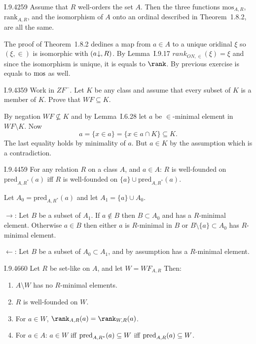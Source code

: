 \begin{lexcopy}{I.9.42}{59}
Assume that $R$ well-orders the set $A$. Then the three 
functions \(\textrm{mos}_{A,R}\), \(\textrm{rank}_{A,R}\),
and the isomorphism of $A$ onto an ordinal described in
Theorem~1.8.2, are all the same.
\end{lexcopy}
The proof of Theorem~1.8.2 dedines a map from \(a\in A\)
to a unique oridinal \(\xi\) so \((\xi,\in)\)
is isomorphic with \((a\kern -0.2em\downarrow,R)\).
By Lemma~I.9.17 \(rank_{ON,\in}(\xi) = \xi\)
and since the isomorphism is unique, it is equals to \(\rank\).
By previous exercise is equals to \(\mathop{\mathrm{mos}}\) as well.

\begin{lexcopy}{I.9.43}{59}
Work in \(ZF^-\). Let $K$ be any class and assume that every
subset of $K$ is a member of $K$. Prove that \(WF \subseteq K\).
\end{lexcopy}

By negation \(WF \not\subseteq K\) and by Lemma~I.6.28
let $a$ be \(\in\)-minimal element in \(WF\setminus K\).
Now
\begin{equation*}
a = \{x\in a\} = \{x \in a\cap K\} \subseteq K.
\end{equation*}
The last equality holds by minimality of $a$.
But \(a \in K\) by the assumption which is a contradiction.

\begin{lexcopy}{I.9.44}{59}
For any relation $R$ on a class $A$, and \(a \in A\): $R$
is well-founded on \(\textrm{pred}_{A,R^*}(a)\) iff $R$
is well-founded on \(\{a\} \cup \textrm{pred}_{A,R^*}(a)\).
\end{lexcopy}
Let \(A_0 = \textrm{pred}_{A,R^*}(a)\) and let \(A_1 = \{a\} \cup A_0\).

\(\rightarrow\): Let $B$ be a subset of \(A_1\).
If \(a \notin B\) then \(B \subset A_0\) and has a $R$-minimal element.
Otherwise \(a \in B\) then either $a$ is $R$-minimal in $B$
or \(B \setminus \{a\} \subset A_0\) has $R$-minimal element.

\(\leftarrow\):  Let $B$ be a subset of \(A_0 \subset A_1\),
and by assumption has a $R$-minimal element.

\begin{lexcopy}{I.9.46}{60}
Let $R$ be set-like on $A$, and let \(W = WF_{A,R}\) Then:
\begin{enumerate}
\item \(A\setminus W\) has no $R$-minimal elements.
\item $R$ is well-founded on $W$.
\item For \(a \in W\), \(\rank_{A,R}(a) = \rank_{W,R}(a)\).
\item For \(a\in A\): \(a\in W\) iff \(\mathop{\mathrm{pred}}_{A,R^*}(a) \subseteq W\)
      iff \(\mathop{\mathrm{pred}}_{A,R}(a) \subseteq W\).
\end{enumerate}
\end{lexcopy}

